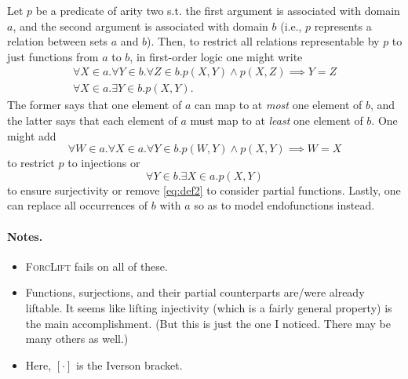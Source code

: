 Let $p$ be a predicate of arity two s.t. the first argument is associated with domain $a$, and the second argument is associated with domain $b$ (i.e., $p$ represents a relation between sets $a$ and $b$). Then, to restrict all relations representable by $p$ to just functions from $a$ to $b$, in first-order logic one might write
\begin{gather}
  \forall X \in a. \forall Y \in b. \forall Z \in b. p(X, Y) \land p(X, Z) \implies Y = Z \label{eq:def1} \\
  \forall X \in a. \exists Y \in b. p(X, Y). \label{eq:def2}
\end{gather}
The former says that one element of $a$ can map to at \emph{most} one element of $b$, and the latter says that each element of $a$ must map to at \emph{least} one element of $b$. One might add
\begin{equation} \label{eq:injectivity}
  \forall W \in a. \forall X \in a. \forall Y \in b. p(W, Y) \land p(X, Y) \implies W = X
\end{equation}
to restrict $p$ to injections or
\begin{equation}
  \forall Y \in b. \exists X \in a. p(X, Y)
\end{equation}
to ensure surjectivity or remove \cref{eq:def2} to consider partial functions. Lastly, one can replace all occurrences of $b$ with $a$ so as to model endofunctions instead.

\paragraph{Notes.}
\begin{itemize}
\item \textsc{ForcLift} fails on all of these.
\item Functions, surjections, and their partial counterparts are/were already liftable. It seems like lifting injectivity (which is a fairly general property) is the main accomplishment. (But this is just the one I noticed. There may be many others as well.)
\item Here, $[\cdot]$ is the Iverson bracket.
\end{itemize}

